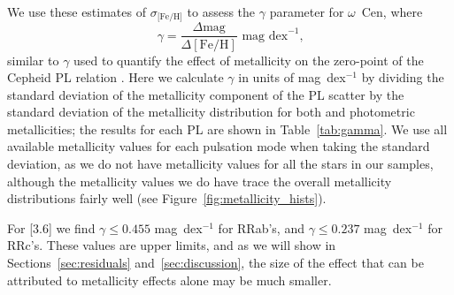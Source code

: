 \documentclass[a4paper,fleqn,usenatbib]{mnras}
\begin{document}
We use these estimates of $\sigma_\text{[Fe/H]}$ to assess the $\gamma$ parameter for $\omega$~Cen, where 
\begin{equation} \label{eqn:gamma}
\gamma = \dfrac {\Delta \text{mag}} {\Delta [\text{Fe/H}]}\text{ mag dex} ^{-1}\text{,}
\end{equation}
similar to $\gamma$ used to quantify the effect of metallicity on the zero-point of the Cepheid PL relation \citep{1998ApJ...498..181K, 2009MNRAS.396.1287S}. Here we calculate $\gamma$ in units of mag~dex$^{-1}$ by dividing the standard deviation of the metallicity component of the PL scatter by the standard deviation of the metallicity distribution for both \citep{2006ApJ...640L..43S} and photometric \citep{2000AJ....119.1824R} metallicities; the results for each PL are shown in Table~\ref{tab:gamma}. We use all available metallicity values for each pulsation mode when taking the standard deviation, as we do not have metallicity values for all the stars in our samples, although the metallicity values we do have trace the overall metallicity distributions fairly well (see Figure~\ref{fig:metallicity_hists}).

For [3.6] we find $\gamma \leq 0.455$ mag~dex$^{-1}$ for RRab's, and $\gamma \leq 0.237$ mag~dex$^{-1}$ for RRc's. These values are upper limits, and as we will show in Sections~\ref{sec:residuals} and~\ref{sec:discussion}, the size of the effect that can be attributed to metallicity effects alone may be much smaller. 
\end{document}
